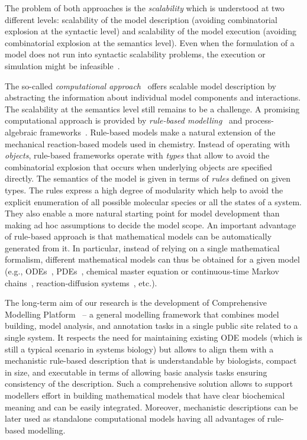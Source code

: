 \documentclass[11pt,a4paper]{report}
\begin{document}
The problem of both approaches is the \emph{scalability} which is understood at two
different levels: scalability of the model description (avoiding combinatorial explosion at the syntactic level) and scalability of the model execution (avoiding combinatorial explosion at the semantics level). Even when the formulation of a model does not run into syntactic scalability problems, the execution or simulation might be infeasible~\cite{Romers107136}. 

The so-called \emph{computational approach}~\cite{Cardelli,Henzinger} offers scalable model description by abstracting the information about individual model components and interactions. The scalability at the semantics level still remains to be a challenge. A promising computational approach is provided by \emph{rule-based modelling}~\cite{kappa_formal,harris2016bionetgen} and process-algebraic frameworks~\cite{Cardelli,BioPEPA,BioSPI}. Rule-based models make a natural extension of the mechanical reaction-based models used in chemistry. Instead of operating with \emph{objects}, rule-based frameworks operate with \emph{types} that allow to avoid the combinatorial explosion that occurs when underlying objects are specified directly. The semantics of the model is given in terms of \emph{rules} defined on given types. The rules express a high degree of modularity which help to avoid the explicit enumeration of all possible molecular species or all the states of a system. They also enable a more natural starting point for model development than making ad hoc assumptions to decide the model scope. An important advantage of rule-based approach is that mathematical models can be automatically generated from it. In particular, instead of relying on a single mathematical formalism, different mathematical models can thus be obtained for a given model (e.g., ODEs~\cite{KaDE}, PDEs~\cite{Smoldyn}, chemical master equation or continuous-time Markov chains~\cite{Pauleve2010,sneddon2011efficient}, reaction-diffusion systems~\cite{So2013}, etc.). 

The long-term aim of our research is the development of Comprehensive Modelling Platform~\cite{cs2bio2013,BCS} -- a general modelling framework that combines model building, model analysis, and annotation tasks in a single public site related to a single system. It respects the need for maintaining existing ODE models (which is still a typical scenario in systems biology) but allows to align them with a mechanistic rule-based description that is understandable by biologists, compact in size, and executable in terms of allowing basic analysis tasks ensuring consistency of the description. Such a comprehensive solution allows to support modellers effort in building mathematical models that have clear biochemical meaning and can be
easily integrated. Moreover, mechanistic descriptions can be later used as standalone computational models having all advantages of rule-based modelling. 
\end{document}
